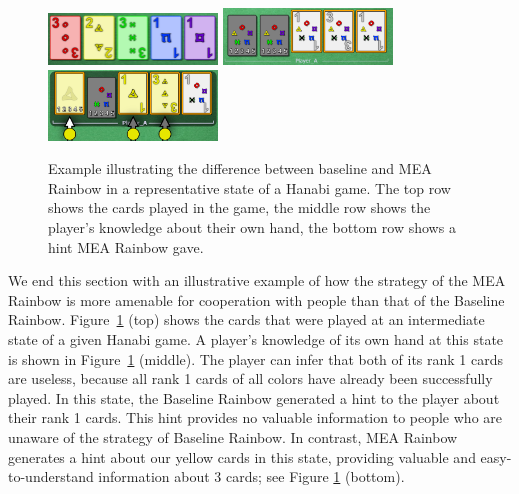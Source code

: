 \documentclass[letterpaper]{article} %
\begin{document}
\begin{figure}[t]
\centering
        \includegraphics[width=4.50cm]{cards already succefuly played.png}
        \includegraphics[width=4.50cm]{hand prior to hint.png}
        \includegraphics[width=4.50cm]{hand knowledge after hint.png}
\caption{Example illustrating the difference  between baseline and MEA Rainbow in a representative state of a Hanabi game. The top row shows the cards played in the game, the middle row shows the player's knowledge about their own hand, the bottom row shows a hint MEA Rainbow gave.}
                           \label{fig:agents_example_comparison}
\end{figure}

We end this section with an illustrative example of how the strategy of the MEA Rainbow is more amenable for cooperation with people than that of the  Baseline Rainbow.
Figure~\ref{fig:agents_example_comparison} (top) shows the cards that were played at an intermediate state of a given Hanabi game.  A player's knowledge of its own hand at this state is shown in Figure~\ref{fig:agents_example_comparison} (middle).
The player can infer that both of its rank 1 cards are useless, because all rank 1 cards of all colors have already been successfully played.  In this state, the  Baseline Rainbow generated a hint to the player   about their rank 1 cards. This hint provides no  valuable information to people who are unaware of the strategy of Baseline Rainbow.
In contrast, MEA Rainbow generates a  hint about  our yellow cards in this state, providing valuable and easy-to-understand information about 3 cards; see Figure \ref{fig:agents_example_comparison} (bottom).
\end{document}
